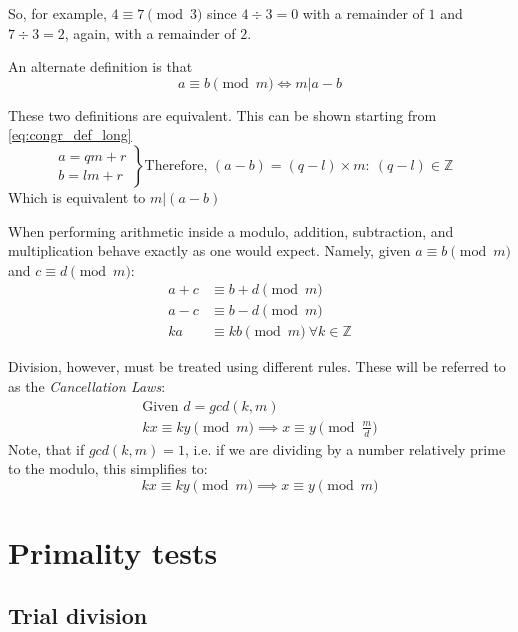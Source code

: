 \documentclass[12pt, titlepage]{article}
\begin{document}
    So, for example, $4 \equiv 7 \pmod{3}$ since $4 \div 3 = 0$ with a remainder of $1$ and
    $7 \div 3 = 2$, again, with a remainder of $2$.

    An alternate definition is that
    \begin{equation*}
        a \equiv b \pmod{m} \iff m | a-b
    \end{equation*}

    These two definitions are equivalent. This can be shown starting from
    \eqref{eq:congr_def_long}
%
    \begin{equation*}
        \left. 
            \begin{aligned}
                a = qm + r\\ 
                b = lm + r
            \end{aligned}
        \right\}
        \text{Therefore, }
        (a - b) = (q-l)\times m :\: (q-l) \in \mathbb{Z}\quad
    \end{equation*}
    Which is equivalent to $m | (a-b)$

    When performing arithmetic inside a modulo, addition, subtraction, and multiplication
    behave exactly as one would expect. Namely, given
    $a\equiv b\pmod{m}$ and $c\equiv d\pmod{m}$:
    \begin{align*}
        a + c &\equiv b + d \pmod{m}\\
        a - c &\equiv b - d \pmod{m}\\
        ka 	  &\equiv kb \pmod{m}\ \forall k \in \mathbb{Z} 
    \end{align*}

    Division, however, must be treated using different rules. These will be referred to as
    the \emph{Cancellation Laws}:
    \begin{gather*}
        \text{Given } d = gcd(k, m)\\
        kx \equiv ky \pmod{m} \implies x \equiv y \pmod{\frac{m}{d}}
    \end{gather*}
    Note, that if $gcd(k, m) = 1$, i.e. if we are dividing by a number relatively prime to
    the modulo, this simplifies to:
    \begin{equation*}
        kx \equiv ky \pmod{m} \implies x \equiv y \pmod{m}
    \end{equation*}


\section{Primality tests}
    \subsection{Trial division}
\end{document}
